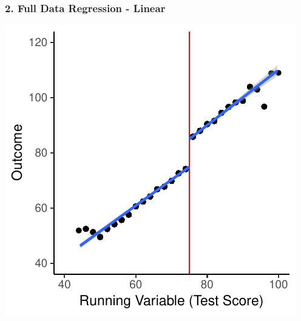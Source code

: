\documentclass[xcolor=x11names,compress]{beamer}\usepackage[]{graphicx}\usepackage[]{color}
\makeatletter
\def\maxwidth{ %
  \ifdim\Gin@nat@width>\linewidth
    \linewidth
  \else
    \Gin@nat@width
  \fi
}
\newenvironment{knitrout}{}{} %
\renewcommand{\(}{\begin{columns}}
\renewcommand{\)}{\end{columns}}
\newcommand{\<}[1]{\begin{column}{#1}}
\renewcommand{\>}{\end{column}}
\makeatother
\begin{document}
\begin{frame}
\frametitle{2. Full Data Regression - Linear}
\begin{center}
\begin{knitrout}
\color{fgcolor}
\includegraphics[width=\maxwidth]{figure/chart4-1} 

\end{knitrout}
\end{center}
\end{frame}
\end{document}
